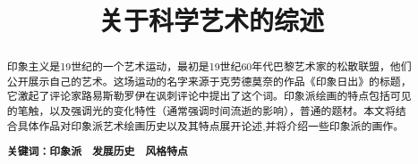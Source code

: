 \documentclass{xcumcmart}
\title{关于科学艺术的综述}
\begin{document}
\renewcommand\arraystretch{2}
\maketitle
\begin{abstract}
\par 印象主义是19世纪的一个艺术运动，最初是19世纪60年代巴黎艺术家的松散联盟，他们公开展示自己的艺术。这场运动的名字来源于克劳德莫奈的作品《印象日出》的标题，它激起了评论家路易斯勒罗伊在讽刺评论中提出了这个词。印象派绘画的特点包括可见的笔触，以及强调光的变化特性（通常强调时间流逝的影响），普通的题材。本文将结合具体作品对印象派艺术绘画历史以及其特点展开论述,并将介绍一些印象派的画作。
\newline
\par\textbf{关键词：印象派　发展历史　风格特点}    
\end{abstract}
\end{document}

